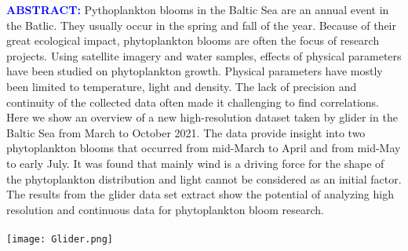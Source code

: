 \documentclass[../Main.tex]{subfiles}
\begin{document}
\begin{tcolorbox}[colback=light-orange, boxrule=0pt]
  \begin{multicols}{3}
    \textcolor{blue}{\textbf{ABSTRACT:}}
Pythoplankton blooms in the Baltic Sea are an annual event in the Batlic. They usually occur in the spring and fall of the year.
    Because of their great ecological impact, phytoplankton blooms are often the focus of research projects. Using satellite imagery and water samples, effects of physical parameters have been studied on phytoplankton growth. Physical parameters have mostly been limited to temperature, light and density.
The lack of precision and continuity of the collected data often made it challenging to find correlations.
   Here we show an overview of a new high-resolution dataset taken by glider in the Baltic Sea from March to October 2021.
    The data provide insight into two phytoplankton blooms that occurred from mid-March to April and from mid-May to early July.
    It was found that mainly wind is a driving force for the shape of the phytoplankton distribution and light cannot be considered as an initial factor.
   The results from the glider data set extract show the potential of analyzing high resolution and continuous data for phytoplankton bloom research.
\ \\
\ \\
    \texttt{[image: Glider.png]}
 \end{multicols}
\end{tcolorbox}
\end{document}
